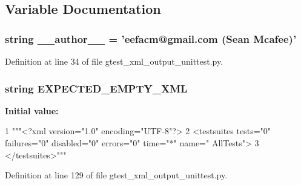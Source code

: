 \subsection{\-Variable \-Documentation}
\hypertarget{namespacegtest__xml__output__unittest_a629d61dfe4da763164a4d1a2d85b0afd}{
\subsubsection[{\-\_\-\-\_\-author\-\_\-\-\_\-}]{\setlength{\rightskip}{0pt plus 5cm}string {\bf \-\_\-\-\_\-author\-\_\-\-\_\-} = 'eefacm@gmail.\-com (\-Sean \-Mcafee)'}}\label{da/d52/namespacegtest__xml__output__unittest_a629d61dfe4da763164a4d1a2d85b0afd}


\-Definition at line 34 of file gtest\-\_\-xml\-\_\-output\-\_\-unittest.\-py.

\hypertarget{namespacegtest__xml__output__unittest_a5f362322c6ef5a690a3303f5df43fb40}{
\subsubsection[{\-E\-X\-P\-E\-C\-T\-E\-D\-\_\-\-E\-M\-P\-T\-Y\-\_\-\-X\-M\-L}]{\setlength{\rightskip}{0pt plus 5cm}string {\bf \-E\-X\-P\-E\-C\-T\-E\-D\-\_\-\-E\-M\-P\-T\-Y\-\_\-\-X\-M\-L}}}\label{da/d52/namespacegtest__xml__output__unittest_a5f362322c6ef5a690a3303f5df43fb40}
{\bfseries \-Initial value\-:}
\begin{DoxyCode}
1 """<?xml version="1.0" encoding="UTF-8"?>
2 <testsuites tests="0" failures="0" disabled="0" errors="0" time="*" name="
      AllTests">
3 </testsuites>"""
\end{DoxyCode}


\-Definition at line 129 of file gtest\-\_\-xml\-\_\-output\-\_\-unittest.\-py.

